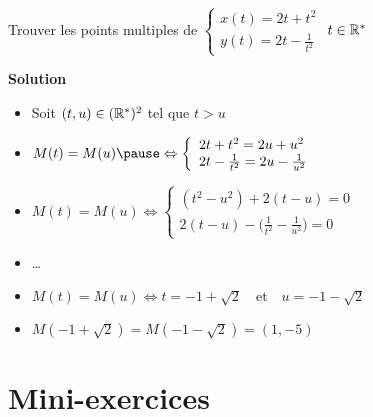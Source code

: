 \begin{frame}
\begin{exemple}
Trouver les points multiples de 
$\left\{
\begin{array}{l}
x(t)=2t+t^2\\
y(t)=2t-\frac{1}{t^2}
\end{array}
\right.$ \quad $t\in\mathbb{R}^*$

\pause

\medskip
\textbf{Solution}

\vspace*{-0.5cm}

\hfill\begin{minipage}{0.3\textwidth}
\end{minipage}

\pause
\vspace*{-3.5cm}

\begin{itemize}
  \item Soit $(t,u)\in(\mathbb{R}^*)^2$ tel que $t>u$
  
  \pause
  \item $
M(t)=M(u)\pause\Leftrightarrow\left\{
\begin{array}{l}
2t+t^2=2u+u^2\\
2t-\frac{1}{t^2}=2u-\frac{1}{u^2}
\end{array}
\right.$
  \pause
  \item $
M(t)=M(u)\Leftrightarrow\left\{
\begin{array}{l}
(t^2-u^2)+2(t-u)=0\\
2(t-u)-\big(\frac{1}{t^2}-\frac{1}{u^2}\big)=0
\end{array}
\right.$
  \pause
  \item \ldots
  \pause
  \item $M(t)=M(u)\Leftrightarrow t=-1+\sqrt{2}\quad\text{et}\quad u=-1-\sqrt{2}$
  \pause
  \item $M(-1+\sqrt{2})=M(-1-\sqrt{2})=(1,-5)$
\end{itemize}
\end{exemple}

\end{frame}




\section{Mini-exercices}

